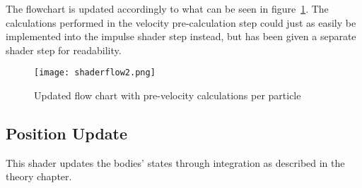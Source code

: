 The flowchart is updated accordingly to what can be seen in figure~\ref{fig:shaderflow2}.
The calculations performed in the velocity pre-calculation step could just as easily
be implemented into the impulse shader step instead, but has been given a separate shader
step for readability.

\begin{figure}[H]
  \centering
  \texttt{[image: shaderflow2.png]}
  \caption{Updated flow chart with pre-velocity calculations per particle}
  \label{fig:shaderflow2}
\end{figure}

\subsection{Position Update}
This shader updates the bodies' states through integration as described in the theory chapter.
